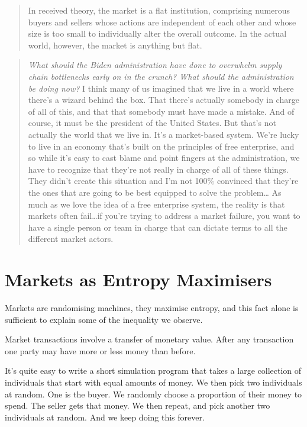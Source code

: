 \documentclass[
]{book}
\begin{document}
\begin{quote}
In received theory, the market is a flat institution, comprising
numerous buyers and sellers whose actions are independent of each other and whose size is
too small to individually alter the overall outcome.
In the actual world, however, the market is anything but flat.
\end{quote}

\begin{quote}
\emph{What should the Biden administration have done to overwhelm supply chain bottlenecks early on in the crunch? What should the administration be doing now?}
I think many of us imagined that we live in a world where there's a wizard behind the box. That there's actually somebody in charge of all of this, and that that somebody must have made a mistake. And of course, it must be the president of the United States. But that's not actually the world that we live in. It's a market-based system. We're lucky to live in an economy that's built on the principles of free enterprise, and so while it's easy to cast blame and point fingers at the administration, we have to recognize that they're not really in charge of all of these things. They didn't create this situation and I'm not 100\% convinced that they're the ones that are going to be best equipped to solve the problem\ldots{}
As much as we love the idea of a free enterprise system, the reality is that markets often fail\ldots if you're trying to address a market failure, you want to have a single person or team in charge that can dictate terms to all the different market actors.
\end{quote}

\hypertarget{markets-as-entropy-maximisers}{%
\section{Markets as Entropy Maximisers}\label{markets-as-entropy-maximisers}}

Markets are randomising machines,
they maximise entropy,
and this fact alone is sufficient to explain some of the inequality we observe.

Market transactions involve a transfer of monetary value. After any transaction one party may have more or less money than before.

It's quite easy to write a short simulation program that takes a large collection of individuals that start with equal amounts of money. We then pick two individuals at random. One is the buyer. We randomly choose a proportion of their money to spend. The seller gets that money. We then repeat, and pick another two individuals at random. And we keep doing this forever.
\end{document}
